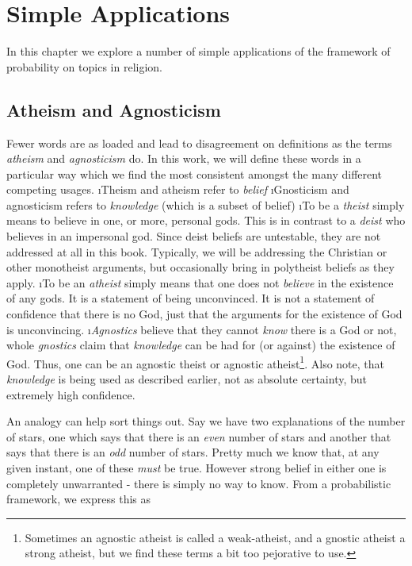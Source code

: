\chapter{Simple Applications}\label{ch:simpleapp}

In this chapter we explore a number of simple applications of the framework of probability on topics in religion.




\section{Atheism and Agnosticism}\label{sec:atheism_agnosticism}

Fewer words are as loaded and lead to disagreement on definitions as the terms {\em atheism} and {\em agnosticism} do.  In this work, we will define these words in a particular way which we find the most consistent amongst the many different competing usages.  
\bi
\i Theism and atheism refer to {\em belief}
\i Gnosticism and agnosticism refers to {\em knowledge} (which is a subset of belief)
\i To be a {\em theist} simply means to believe in one, or more, personal gods.  This is in contrast to a {\em deist} who believes in an impersonal god.  Since deist beliefs are untestable, they are not addressed at all in this book.  Typically, we will be addressing the Christian or other monotheist arguments, but occasionally bring in polytheist beliefs as they apply.
\i To be an {\em atheist} simply means that one does not {\em believe} in the existence of any gods.  It is a statement of being unconvinced.  It is not a statement of confidence that there is no God, just that the arguments for the existence of God is unconvincing.
\i {\em Agnostics} believe that they cannot {\em know} there is a God or not, whole {\em gnostics} claim that {\em knowledge} can be had for (or against) the existence of God.  Thus, one can be an agnostic theist or agnostic atheist\footnote{Sometimes an agnostic atheist is called a weak-atheist, and a gnostic atheist a strong atheist, but we find these terms a bit too pejorative to use.}.  Also note, that {\em knowledge} is being used as described earlier, not as absolute certainty, but extremely high confidence. 
\ei

An analogy can help sort things out.  Say we have two explanations of the number of stars, one which
says that there is an \emph{even} number of stars and another that says
that there is an \emph{odd} number of stars. Pretty much we know that,
at any given instant, one of these \emph{must} be true. However strong
belief in either one is completely unwarranted - there is simply no way
to know. From a probabilistic framework, we express this as


